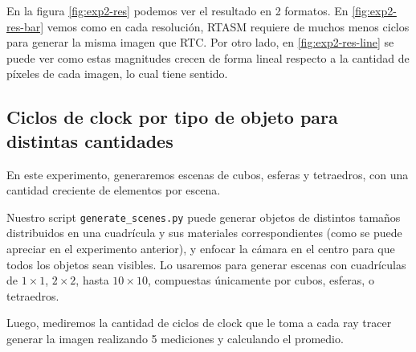 En la figura \ref{fig:exp2-res} podemos ver el resultado en 2 formatos. En
\ref{fig:exp2-res-bar} vemos como en cada resolución, RTASM requiere de muchos
menos ciclos para generar la misma imagen que RTC. Por otro lado, en
\ref{fig:exp2-res-line} se puede ver como estas magnitudes crecen de forma
lineal respecto a la cantidad de píxeles de cada imagen, lo cual tiene sentido.

\subsection{Ciclos de clock por tipo de objeto para distintas cantidades}

En este experimento, generaremos escenas de cubos, esferas y tetraedros, con una
cantidad creciente de elementos por escena.

Nuestro script \texttt{generate\_scenes.py} puede generar objetos de distintos
tamaños distribuidos en una cuadrícula y sus materiales correspondientes (como
se puede apreciar en el experimento anterior), y enfocar la cámara en el centro
para que todos los objetos sean visibles. Lo usaremos para generar escenas con
cuadrículas de $1 \times 1$, $2 \times 2$, hasta $10 \times 10$, compuestas
únicamente por cubos, esferas, o tetraedros.

Luego, mediremos la cantidad de ciclos de clock que le toma a cada ray tracer
generar la imagen realizando 5 mediciones y calculando el promedio.

